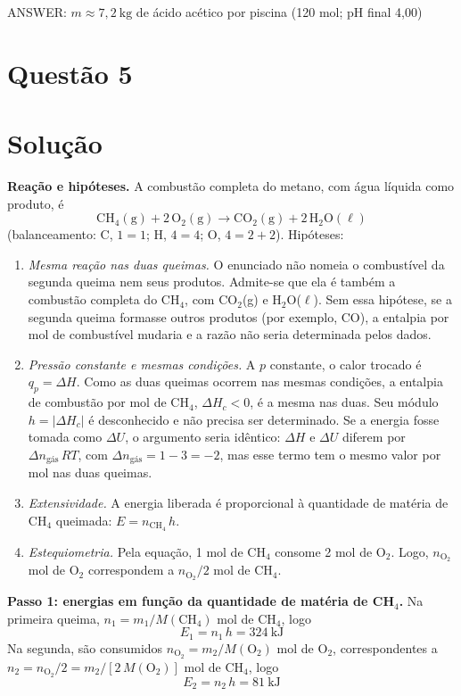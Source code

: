 \documentclass{article}%
\begin{document}
ANSWER: $m \approx 7{,}2\ \text{kg}$ de ácido acético por piscina (120 mol; pH final 4,00)%
\newpage%
\section*{Questão 5}

\section*{Solução}

\textbf{Reação e hipóteses.} A combustão completa do metano, com água líquida como produto, é
\[
\mathrm{CH_4(g) + 2\,O_2(g) \longrightarrow CO_2(g) + 2\,H_2O(\ell)}
\]
(balanceamento: C, $1=1$; H, $4=4$; O, $4=2+2$). Hipóteses:
\begin{enumerate}
\item \textit{Mesma reação nas duas queimas.} O enunciado não nomeia o combustível da segunda queima nem seus produtos. Admite-se que ela é também a combustão completa do CH$_4$, com CO$_2$(g) e H$_2$O($\ell$). Sem essa hipótese, se a segunda queima formasse outros produtos (por exemplo, CO), a entalpia por mol de combustível mudaria e a razão não seria determinada pelos dados.
\item \textit{Pressão constante e mesmas condições.} A $p$ constante, o calor trocado é $q_p=\Delta H$. Como as duas queimas ocorrem nas mesmas condições, a entalpia de combustão por mol de CH$_4$, $\Delta H_c<0$, é a mesma nas duas. Seu módulo $h=|\Delta H_c|$ é desconhecido e não precisa ser determinado. Se a energia fosse tomada como $\Delta U$, o argumento seria idêntico: $\Delta H$ e $\Delta U$ diferem por $\Delta n_{\text{gás}}\,RT$, com $\Delta n_{\text{gás}}=1-3=-2$, mas esse termo tem o mesmo valor por mol nas duas queimas.
\item \textit{Extensividade.} A energia liberada é proporcional à quantidade de matéria de CH$_4$ queimada: $E=n_{\mathrm{CH_4}}\,h$.
\item \textit{Estequiometria.} Pela equação, 1 mol de CH$_4$ consome 2 mol de O$_2$. Logo, $n_{\mathrm{O_2}}$ mol de O$_2$ correspondem a $n_{\mathrm{O_2}}/2$ mol de CH$_4$.
\end{enumerate}

\textbf{Passo 1: energias em função da quantidade de matéria de CH$_4$.} Na primeira queima, $n_1=m_1/M(\mathrm{CH_4})$ mol de CH$_4$, logo
\[
E_1=n_1\,h=324\ \text{kJ}
\]
Na segunda, são consumidos $n_{\mathrm{O_2}}=m_2/M(\mathrm{O_2})$ mol de O$_2$, correspondentes a $n_2=n_{\mathrm{O_2}}/2=m_2/[2\,M(\mathrm{O_2})]$ mol de CH$_4$, logo
\[
E_2=n_2\,h=81\ \text{kJ}
\]
\end{document}
